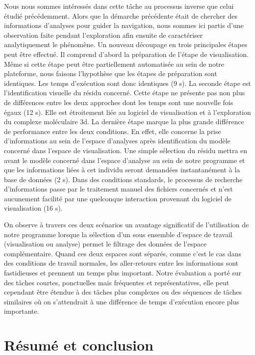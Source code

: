 Nous nous sommes intéressés dans cette tâche au processus inverse que celui étudié précédemment. Alors que la démarche précédente était de chercher des informations d'analyses pour guider la navigation, nous sommes ici partis d'une observation faite pendant l'exploration afin ensuite de caractériser analytiquement le phénomène.
Un nouveau découpage en trois principales étapes peut être effectué. Il comprend d'abord la préparation de l'étape de visualisation. Même si cette étape peut être partiellement automatisée au sein de notre plateforme, nous faisons l'hypothèse que les étapes de préparation sont identiques. Les temps d'exécution sont donc identiques (9 s).
La seconde étape est l'identification visuelle du résidu concerné. Cette étape ne présente pas non plus de différences entre les deux approches dont les temps sont une nouvelle fois égaux (12 s). Elle est étroitement liée au logiciel de visualisation et à l'exploration du complexe moléculaire 3d.
La dernière étape marque la plus grande différence de performance entre les deux conditions. En effet, elle concerne la prise d'informations au sein de l'espace d'analyses après identification du modèle concerné dans l'espace de visualisation. Une simple sélection du résidu mettra en avant le modèle concerné dans l'espace d'analyse au sein de notre programme et que les informations liées à cet individu seront demandées instantanément à la base de données (2 s). Dans des conditions standards, le processus de recherche d'informations passe par le traitement manuel des fichiers concernés et n'est aucunement facilité par une quelconque interaction provenant du logiciel de visualisation (16 s).

On observe à travers ces deux scénarios un avantage significatif de l'utilisation de notre programme lorsque la sélection d'un sous ensemble d'espace de travail (visualisation ou analyse) permet le filtrage des données de l'espace complémentaire. Quand ces deux espaces sont séparés, comme c'est le cas dans des conditions de travail normales, les aller-retours entre les informations sont fastidieuses et prennent un temps plus important. Notre évaluation a porté sur des tâches courtes, ponctuelles mais fréquentes et représentatives, elle peut cependant être étendue à des tâches plus complexes ou des séquences de tâches similaires où on s'attendrait à une différence de temps d'exécution encore plus importante.

\section{Résumé et conclusion}
\label{sec:ConclusionVisuAna}

